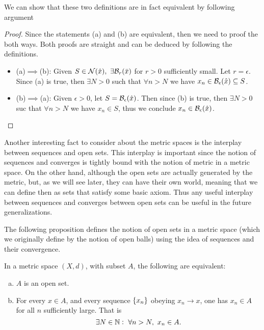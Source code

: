We can show that these two definitions are in fact equivalent by following argument
\begin{proof}
	Since the statements (a) and (b) are equivalent, then we need to proof the both ways. Both proofs are straight and can be deduced by following the definitions.
	\begin{itemize}
		\item (a)$\implies$(b): Given $S\in \mathcal{N}(\hat{x}),\ \exists \mathcal{B}_{r}(\bar{x})$ for $r>0$ sufficiently small. Let $r=\epsilon$. Since (a) is true, then $\exists N>0$ such that $\forall n>N$ we have $x_n \in \mathcal{B}_{\epsilon}(\hat{x}) \subseteq S$.
		\item (b)$\implies$(a): Given $\epsilon>0$, let $S = \mathcal{B}_{\epsilon}(\hat{x})$. Then since (b) is true, then $\exists N>0$ suc that $\forall n>N$ we have $x_n \in S$, thus we conclude $x_n \in \mathcal{B}_{\epsilon}(\hat{x})$. 
	\end{itemize}
\end{proof}


Another interesting fact to consider about the metric spaces is the interplay between sequences and open sets. This interplay is important since the notion of sequences and converges is tightly bound with the notion of metric in a metric space. On the other hand, although the open sets are actually generated by the metric, but, as we will see later, they can have their own world, meaning that we can define then as sets that satisfy some basic axiom. Thus any useful interplay between sequences and converges between open sets can be useful in the future generalizations.

The following proposition defines the notion of open sets in a metric space (which we originally define by the notion of open balls) using the idea of sequences and their convergence. 

\begin{proposition}
	In a metric space $(X,d)$, with subset $A$, the following are equivalent:
	\begin{enumerate}[(a)]
		\item $A$ is an open set.
		\item For every $x\in A$, and every sequence $\{x_n\}$ obeying $x_n\to x$, one has $x_n\in A$ for all $n$ sufficiently large. That is 
		\[ \exists N \in \mathbb{N}:\ \forall n>N,\ x_n \in A. \]
	\end{enumerate}
\end{proposition}


